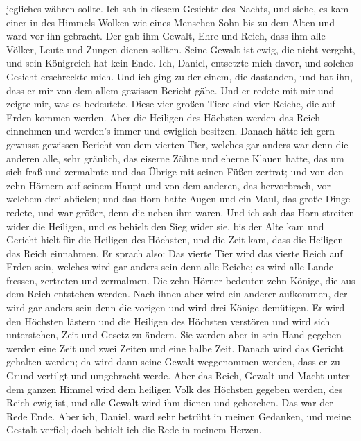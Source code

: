 jegliches währen sollte.  Ich sah in diesem Gesichte des
Nachts, und siehe, es kam einer in des Himmels Wolken wie eines Menschen
Sohn bis zu dem Alten und ward vor ihn gebracht.  Der gab
ihm Gewalt, Ehre und Reich, dass ihm alle Völker, Leute und Zungen
dienen sollten. Seine Gewalt ist ewig, die nicht vergeht, und sein
Königreich hat kein Ende.  Ich, Daniel, entsetzte mich
davor, und solches Gesicht erschreckte mich.  Und ich
ging zu der einem, die dastanden, und bat ihn, dass er mir von dem allem
gewissen Bericht gäbe. Und er redete mit mir und zeigte mir, was es
bedeutete.  Diese vier großen Tiere sind vier Reiche, die
auf Erden kommen werden.  Aber die Heiligen des Höchsten
werden das Reich einnehmen und werden's immer und ewiglich besitzen.
 Danach hätte ich gern gewusst gewissen Bericht von dem
vierten Tier, welches gar anders war denn die anderen alle, sehr
gräulich, das eiserne Zähne und eherne Klauen hatte, das um sich fraß
und zermalmte und das Übrige mit seinen Füßen zertrat; 
und von den zehn Hörnern auf seinem Haupt und von dem anderen, das
hervorbrach, vor welchem drei abfielen; und das Horn hatte Augen und ein
Maul, das große Dinge redete, und war größer, denn die neben ihm waren.
 Und ich sah das Horn streiten wider die Heiligen, und es
behielt den Sieg wider sie,  bis der Alte kam und Gericht
hielt für die Heiligen des Höchsten, und die Zeit kam, dass die Heiligen
das Reich einnahmen.  Er sprach also: Das vierte Tier
wird das vierte Reich auf Erden sein, welches wird gar anders sein denn
alle Reiche; es wird alle Lande fressen, zertreten und zermalmen.
 Die zehn Hörner bedeuten zehn Könige, die aus dem Reich
entstehen werden. Nach ihnen aber wird ein anderer aufkommen, der wird
gar anders sein denn die vorigen und wird drei Könige demütigen.
 Er wird den Höchsten lästern und die Heiligen des
Höchsten verstören und wird sich unterstehen, Zeit und Gesetz zu ändern.
Sie werden aber in sein Hand gegeben werden eine Zeit und zwei Zeiten
und eine halbe Zeit.  Danach wird das Gericht gehalten
werden; da wird dann seine Gewalt weggenommen werden, dass er zu Grund
vertilgt und umgebracht werde.  Aber das Reich, Gewalt
und Macht unter dem ganzen Himmel wird dem heiligen Volk des Höchsten
gegeben werden, des Reich ewig ist, und alle Gewalt wird ihm dienen und
gehorchen.  Das war der Rede Ende. Aber ich, Daniel, ward
sehr betrübt in meinen Gedanken, und meine Gestalt verfiel; doch behielt
ich die Rede in meinem Herzen.

